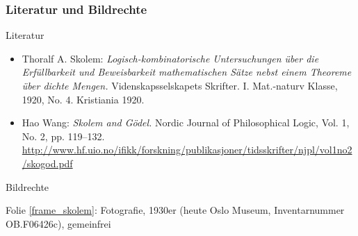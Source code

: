 \documentclass[onlymath]{beamer}
\begin{document}
\begin{frame}[t]\frametitle{Literatur und Bildrechte}

\alert{Literatur}\bigskip

\begin{itemize}
\item Thoralf A. Skolem: \emph{Logisch-kombinatorische Untersuchungen über die Erfüllbarkeit und Beweisbarkeit mathematischen Sätze nebst einem Theoreme über dichte Mengen.} Videnskapsselskapets Skrifter. I. Mat.-naturv Klasse, 1920, No. 4. Kristiania 1920.
\item Hao Wang: \emph{Skolem and Gödel.} Nordic Journal of Philosophical Logic, Vol. 1, No. 2, pp. 119–132. \url{http://www.hf.uio.no/ifikk/forskning/publikasjoner/tidsskrifter/njpl/vol1no2/skogod.pdf}
\end{itemize}

\bigskip

\alert{Bildrechte}\bigskip

Folie \ref{frame_skolem}: Fotografie, 1930er (heute Oslo Museum, Inventarnummer OB.F06426c), gemeinfrei

\end{frame}
\end{document}
